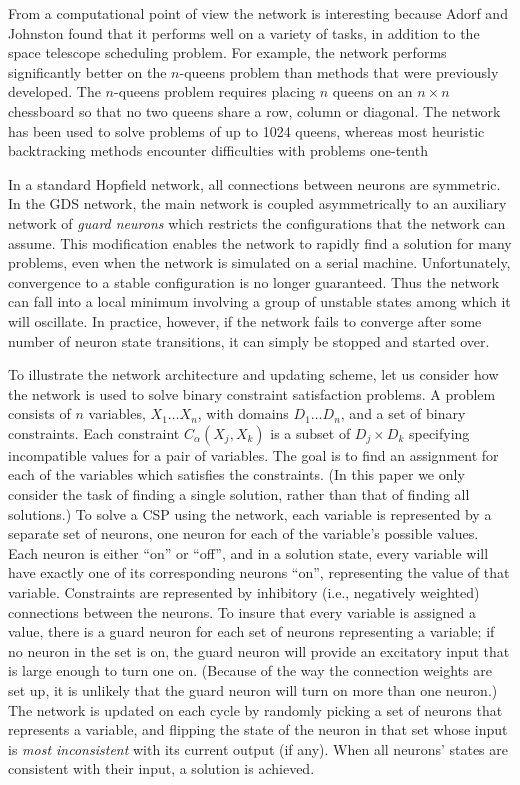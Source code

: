 \documentclass[twoside,12pt,titlepage,a4paper]{article}
\begin{document}
From a computational point of view the network is interesting because
Adorf and Johnston found that it performs well on a variety of tasks,
in addition to the space telescope scheduling problem. For example,
the network performs significantly better on the $n$-queens problem
than methods that were previously developed.  The $n$-queens problem
requires placing $n$ queens on an $n \times n$ chessboard so that no
two queens share a row, column or diagonal.  The network has been used
to solve problems of up to 1024 queens, whereas most heuristic
backtracking methods encounter difficulties with problems one-tenth

In a standard Hopfield network, all connections between neurons are
symmetric. In the GDS network, the main network is coupled
asymmetrically to an auxiliary network of {\em guard neurons} which
restricts the configurations that the network can assume.  This
modification enables the network to rapidly find a solution for many
problems, even when the network is simulated on a serial machine.  
Unfortunately, convergence to a stable configuration is no
longer guaranteed.  Thus the network can fall into a local minimum
involving a group of unstable states among which it will oscillate.
In practice, however, if the network fails to converge after some
number of neuron state transitions, it can simply be stopped and
started over.

To illustrate the network architecture and updating scheme, let us
consider how the network is used to solve binary constraint
satisfaction problems.  A problem consists of $n$ variables,
$X_{1}\ldots X_{n}$, with domains $D_{1}\ldots D_{n}$, and a set of
binary constraints. Each constraint $C_{\alpha}(X_{j},X_{k})$ is a
subset of $D_{j} \times D_{k}$ specifying incompatible values for a
pair of variables. The goal is to find an assignment for each of the
variables which satisfies the constraints. (In this paper we only
consider the task of finding a single solution, rather than that of
finding all solutions.)  To solve a CSP using the network, each
variable is represented by a separate set of neurons, one neuron for
each of the variable's possible values.  Each neuron is either ``on''
or ``off'', and in a solution state, every variable will have exactly
one of its corresponding neurons ``on'', representing the value of
that variable.  Constraints are represented by inhibitory (i.e.,
negatively weighted) connections between the neurons.  To insure that
every variable is assigned a value, there is a guard neuron for each
set of neurons representing a variable; if no neuron in the set is on,
the guard neuron will provide an excitatory input that is large enough
to turn one on.  (Because of the way the connection weights are set up, it
is unlikely that the guard neuron will turn on more than one neuron.)
The network is updated on each cycle by randomly picking a set of
neurons that represents a variable, and flipping the state of the
neuron in that set whose input is {\em most inconsistent} with its
current output (if any).  When all neurons' states are consistent with
their input, a solution is achieved.
\end{document}
